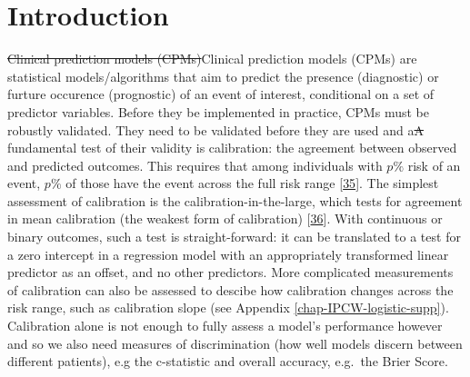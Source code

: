 \documentclass[12pt,PhD,twoside,openright]{muthesis}
\begin{document}
\hypertarget{introduction-4}{%
\section{Introduction}\label{introduction-4}}

\sout{Clinical prediction models (CPMs)}Clinical prediction models (CPMs) are statistical models/algorithms that aim to predict the presence (diagnostic) or furture occurence (prognostic) of an event of interest, conditional on a set of predictor variables. Before they be implemented in practice, CPMs must be robustly validated. They need to be validated before they are used and a\sout{A} fundamental test of their validity is calibration: the agreement between observed and predicted outcomes. This requires that among individuals with \(p\%\) risk of an event, \(p\%\) of those have the event across the full risk range {[}\protect\hyperlink{ref-steyerberg_clinical_2008}{35}{]}. The simplest assessment of calibration is the calibration-in-the-large, which tests for agreement in mean calibration (the weakest form of calibration) {[}\protect\hyperlink{ref-calster_calibration_2016-1}{36}{]}. With continuous or binary outcomes, such a test is straight-forward: it can be translated to a test for a zero intercept in a regression model with an appropriately transformed linear predictor as an offset, and no other predictors. More complicated measurements of calibration can also be assessed to descibe how calibration changes across the risk range, such as calibration slope (see Appendix \ref{chap-IPCW-logistic-supp}). Calibration alone is not enough to fully assess a model's performance however and so we also need measures of discrimination (how well models discern between different patients), e.g the c-statistic and overall accuracy, e.g.~the Brier Score.
\end{document}
